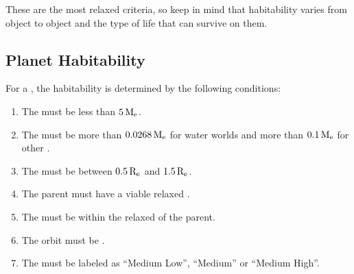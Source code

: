 \documentclass[letterpaper,10pt,english]{sphinxmanual}
\begin{document}
\sphinxAtStartPar
These are the most relaxed criteria, so keep in mind that habitability varies
from object to object and the type of life that can survive on them.


\subsection{Planet Habitability}
\label{\detokenize{quantities/habitability/planet_habitability:planet-habitability}}\label{\detokenize{quantities/habitability/planet_habitability::doc}}\label{\detokenize{quantities/habitability/planet_habitability:id1}}
\sphinxAtStartPar
For a {\hyperref[\detokenize{celestial_bodies/planet:id1}]{}}, the habitability is determined by the following conditions:
\begin{enumerate}
%
\item {} 
\sphinxAtStartPar
The {\hyperref[\detokenize{quantities/material/mass:id1}]{}} must be less than \(5 \, {\rm M_e}\).

\item {} 
\sphinxAtStartPar
The {\hyperref[\detokenize{quantities/material/mass:id1}]{}} must be more than \(0.0268 \, {\rm M_e}\) for water worlds and more than \(0.1 \, {\rm M_e}\) for other {\hyperref[\detokenize{quantities/material/composition_type:id1}]{}}.

\item {} 
\sphinxAtStartPar
The {\hyperref[\detokenize{quantities/geometric/radius:id1}]{}} must be between \(0.5 \, {\rm R_e}\) and \(1.5 \, {\rm R_e}\).

\item {} 
\sphinxAtStartPar
The {\hyperref[\detokenize{celestial_bodies/planet:id1}]{}} parent must have a viable relaxed {\hyperref[\detokenize{quantities/habitability/habitable_zones/habitable_zones:id1}]{}}.

\item {} 
\sphinxAtStartPar
The {\hyperref[\detokenize{quantities/orbital/semi_major_axis:id1}]{}} must be within the relaxed {\hyperref[\detokenize{quantities/habitability/habitable_zones/habitable_zones:id1}]{}} of the parent.

\item {} 
\sphinxAtStartPar
The orbit must be {\hyperref[\detokenize{quantities/orbital/orbital_stability:id1}]{}}.

\item {} 
\sphinxAtStartPar
The {\hyperref[\detokenize{quantities/surface/internal_heating/tectonic_activity:id1}]{}} must be labeled as “Medium Low”, “Medium” or “Medium High”.

\end{enumerate}
\end{document}

